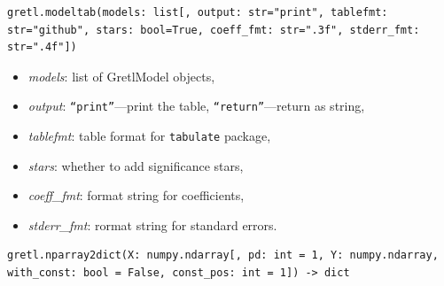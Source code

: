 \begin{lstlisting}[style=pythonstylefoot]
gretl.modeltab(models: list[, output: str="print", tablefmt: str="github", stars: bool=True, coeff_fmt: str=".3f", stderr_fmt: str=".4f"])
\end{lstlisting}
\begin{footnotesize}
\begin{itemize}
	\item[] \textit{models}: list of GretlModel objects,
	\item[] \textit{output}: \texttt{``print''}---print the table,
		\texttt{``return''}---return as string,
	\item[] \textit{tablefmt}: table format for \texttt{tabulate} package,
	\item[] \textit{stars}: whether to add significance stars,
	\item[] \textit{coeff\_fmt}: format string for coefficients,
	\item[] \textit{stderr\_fmt}: rormat string for standard errors.
\end{itemize}\end{footnotesize}

\begin{lstlisting}[style=pythonstylefoot]
gretl.nparray2dict(X: numpy.ndarray[, pd: int = 1, Y: numpy.ndarray, with_const: bool = False, const_pos: int = 1]) -> dict
\end{lstlisting}

